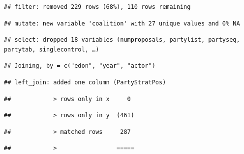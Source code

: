 \documentclass[
]{article}
\newenvironment{Shaded}{\begin{snugshade}}{\end{snugshade}}
\newcommand{\DataTypeTok}[1]{\textcolor[rgb]{0.13,0.29,0.53}{#1}}
\newcommand{\KeywordTok}[1]{\textcolor[rgb]{0.13,0.29,0.53}{\textbf{#1}}}
\newcommand{\NormalTok}[1]{#1}
\newcommand{\OperatorTok}[1]{\textcolor[rgb]{0.81,0.36,0.00}{\textbf{#1}}}
\newcommand{\StringTok}[1]{\textcolor[rgb]{0.31,0.60,0.02}{#1}}
\begin{document}
\begin{verbatim}
## filter: removed 229 rows (68%), 110 rows remaining
\end{verbatim}

\begin{verbatim}
## mutate: new variable 'coalition' with 27 unique values and 0% NA
\end{verbatim}

\begin{Shaded}
\end{Shaded}

\begin{verbatim}
## select: dropped 18 variables (numproposals, partylist, partyseq, partytab, singlecontrol, …)
\end{verbatim}

\begin{verbatim}
## Joining, by = c("edon", "year", "actor")
\end{verbatim}

\begin{verbatim}
## left_join: added one column (PartyStratPos)
\end{verbatim}

\begin{verbatim}
##            > rows only in x     0
\end{verbatim}

\begin{verbatim}
##            > rows only in y  (461)
\end{verbatim}

\begin{verbatim}
##            > matched rows     287
\end{verbatim}

\begin{verbatim}
##            >                 =====
\end{verbatim}
\end{document}
